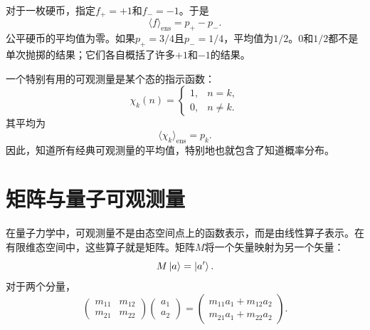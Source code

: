 对于一枚硬币，指定\(f_+=+1\)和\(f_-=-1\)。于是
\begin{equation}
  \langle f\rangle_{\mathrm{ens}}
  =p_+-p_-.
  \label{eq:l02-coin-expectation}
\end{equation}
公平硬币的平均值为零。如果\(p_+=3/4\)且\(p_-=1/4\)，平均值为\(1/2\)。\(0\)和\(1/2\)都不是单次抛掷的结果；它们各自概括了许多\(+1\)和\(-1\)的结果。

\begin{classroomqa}
\end{classroomqa}

一个特别有用的可观测量是某个态的指示函数：
\begin{equation}
  \chi_k(n)=
  \begin{cases}
    1,&n=k,\\
    0,&n\ne k.
  \end{cases}
\end{equation}
其平均为
\begin{equation}
  \langle\chi_k\rangle_{\mathrm{ens}}=p_k.
\end{equation}
因此，知道所有经典可观测量的平均值，特别地也就包含了知道概率分布。

\section{矩阵与量子可观测量}

在量子力学中，可观测量不是由态空间点上的函数表示，而是由线性算子表示。在有限维态空间中，这些算子就是矩阵。矩阵\(M\)将一个矢量映射为另一个矢量：
\begin{equation}
  M\left\lvert a\right\rangle=\left\lvert a'\right\rangle.
  \label{eq:l02-matrix-action}
\end{equation}
对于两个分量，
\begin{equation}
  \begin{pmatrix}
    m_{11}&m_{12}\\
    m_{21}&m_{22}
  \end{pmatrix}
  \begin{pmatrix}a_1\\a_2\end{pmatrix}
  =
  \begin{pmatrix}
    m_{11}a_1+m_{12}a_2\\
    m_{21}a_1+m_{22}a_2
  \end{pmatrix}.
  \label{eq:l02-matrix-components}
\end{equation}

